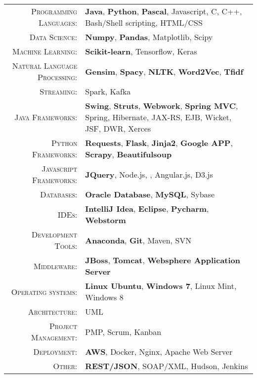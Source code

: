 %
%
%

\renewcommand{\arraystretch}{1.1}

	\begin{tabular}{>{}r>{}p{13cm}} 
		\textsc{Programming Languages:}  		&   \textbf{Java}, \textbf{Python}, \textbf{Pascal},  Javascript, C, C++, Bash/Shell scripting, HTML/CSS\\ 
		\textsc{Data Science:}                  &   \textbf{Numpy}, \textbf{Pandas}, Matplotlib, Scipy\\
		\textsc{Machine Learning:}				 &  \textbf{Scikit-learn}, Tensorflow, Keras\\
		\textsc{Natural Language Processing:} 	 & \textbf{Gensim}, \textbf{Spacy}, \textbf{NLTK}, \textbf{Word2Vec}, \textbf{Tfidf}\\
		\textsc{Streaming:}                  	&   Spark, Kafka\\
		\textsc{Java Frameworks:} 				& \textbf{Swing},  \textbf{Struts}, \textbf{Webwork}, \textbf{Spring MVC}, Spring, Hibernate, JAX-RS, EJB, Wicket, JSF, DWR, Xerces\\
		\textsc{Python Frameworks:} 				& \textbf{Requests}, \textbf{Flask}, \textbf{Jinja2}, \textbf{Google APP},  \textbf{Scrapy}, \textbf{Beautifulsoup}\\ 
		\textsc{Javascript Frameworks:} 				& \textbf{JQuery}, Node.js, , Angular.js, D3.js \\
		\textsc{Databases:}                  &   \textbf{Oracle Database}, \textbf{MySQL}, Sybase \\ 
		\textsc{IDEs:}	  		&   \textbf{IntelliJ Idea}, \textbf{Eclipse}, \textbf{Pycharm}, \textbf{Webstorm}  \\ 
		\textsc{Development Tools:} & 	  		\textbf{Anaconda}, \textbf{Git}, Maven, SVN \\
		\textsc{Middleware:}				        &   \textbf{JBoss}, \textbf{Tomcat}, \textbf{Websphere Application Server} \\ 
		\textsc{Operating systems:}	        &   \textbf{Linux Ubuntu}, \textbf{Windows 7}, Linux Mint, Windows 8\\ 
		\textsc{Architecture:}				        &   UML \\
		\textsc{Project Management:}				        &   PMP, Scrum, Kanban \\
		\textsc{Deployment:}				        &   \textbf{AWS}, Docker, Nginx, Apache Web Server\\
		\textsc{Other:}					        &   \textbf{REST/JSON}, SOAP/XML, Hudson, Jenkins \\
	\end{tabular}